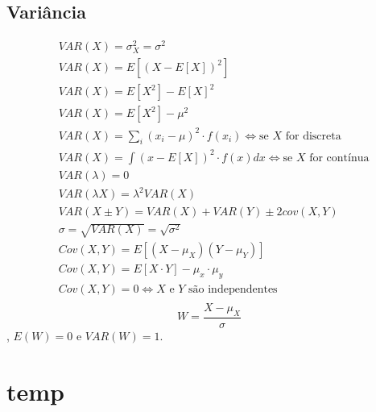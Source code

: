 \documentclass[a4paper]{article}
\begin{document}
\begin{multicols}{3}
\subsection{Variância}
\begin{align*}
  &VAR(X) = \sigma^2_X = \sigma^2 \\
  &VAR(X) = E[(X - E[X])^2] \\
  &VAR(X) = E[X^2] - E[X]^2 \\
  &VAR(X) = E[X^2] - \mu^2 \\
  &VAR(X) = \sum_i (x_i - \mu)^2 \cdot f(x_i) \iff \text{se } X \text{ for discreta} \\
  &VAR(X) = \int (x - E[X])^2 \cdot f(x) dx \iff \text{se } X \text{ for contínua} \\
  &VAR(\lambda) = 0 \\
  &VAR(\lambda X) = \lambda^2 VAR(X) \\
  &VAR(X \pm Y) = VAR(X) + VAR(Y) \pm 2 cov(X, Y) \\
  &\sigma = \sqrt{VAR(X)} = \sqrt{\sigma^2} \\
  &Cov(X, Y) = E[(X - \mu_X)(Y - \mu_Y)] \\
  &Cov(X, Y) = E[X \cdot Y] - \mu_x \cdot \mu_y \\
  &Cov(X, Y) = 0 \iff X \text{ e } Y \text{ são independentes} \\
\end{align*}
$$W = \frac{X - \mu_X}{\sigma}$$,
$E(W) = 0$ e $VAR(W) = 1$.



\section{temp}
\blinddocument
\end{multicols}
\end{document}
